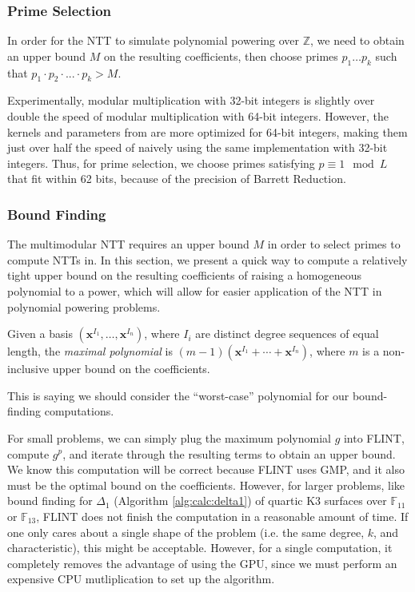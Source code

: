 \subsubsection{Prime Selection}
In order for the NTT to simulate polynomial powering over $\mathbb{Z}$, 
we need to obtain an upper bound $M$ 
on the resulting coefficients, then 
choose primes $p_1 \dots p_k$ such 
that $p_1 \cdot p_2 \cdot ... \cdot p_k > M$.

Experimentally, modular multiplication with 32-bit integers 
is slightly over double the speed of modular 
multiplication with 64-bit integers. 
However, the kernels and parameters from \cite{ozcan-2023-fft} are more 
optimized for 64-bit integers, making them just over half the
speed of naively using the same implementation with 32-bit 
integers. Thus, for prime selection, 
we choose primes satisfying $p \equiv 1 \mod L$ that fit 
within 62 bits, because of the precision of Barrett Reduction.

\subsubsection{Bound Finding}
The multimodular NTT requires an upper bound $M$ in order to select primes 
to compute NTTs in. In this section, we present a quick way to compute a 
relatively tight upper bound on the resulting 
coefficients of raising a homogeneous polynomial to a power, which
will allow for easier application of the NTT in polynomial powering
problems.

\begin{defn}
    Given a basis $(\mathbf{x}^{I_1}, \dots, \mathbf{x}^{I_n})$, 
    where $I_i$ are distinct degree sequences of equal 
    length, the \textit{maximal polynomial} is 
    $(m - 1)(\mathbf{x}^{I_1} + \cdots + \mathbf{x}^{I_n})$, 
    where $m$ is a non-inclusive upper bound on the coefficients.
\end{defn}

This is saying we should consider the ``worst-case'' polynomial 
for our bound-finding computations.

For small problems, we can simply plug the maximum 
polynomial $g$ into FLINT, compute $g ^ p$, and 
iterate through the resulting terms to obtain an upper bound.
We know this computation will be correct because FLINT uses GMP,
and it also must be the optimal bound on the coefficients. 
However, for larger problems, like bound finding for 
$\Delta_1$ (Algorithm \ref{alg:calc:delta1}) of
quartic K3 surfaces over $\mathbb{F}_{11}$ or $\mathbb{F}_{13}$, 
FLINT does not finish the computation in a reasonable amount of time.
If one only cares about a single shape of the problem 
(i.e. the same degree, \(k\), and characteristic),
this might be acceptable.
However, for a single computation, it completely removes 
the advantage of using the GPU, since we must perform an 
expensive CPU mutliplication to set up the algorithm.


